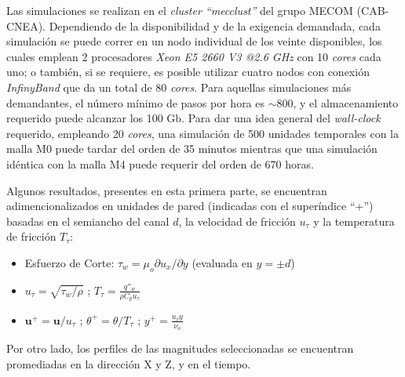 Las simulaciones se realizan en el \textit{cluster ``mecclust''} del grupo MECOM (CAB-CNEA). Dependiendo de la disponibilidad y de la exigencia demandada, cada simulación se puede correr en un nodo individual de los veinte disponibles, los cuales emplean 2 procesadores \textit{Xeon E5 2660 V3 @2.6 GHz} con 10 \textit{cores} cada uno; o también, si se requiere, es posible utilizar cuatro nodos con conexión \textit{InfinyBand} que da un total de 80 \textit{cores}. Para aquellas simulaciones más demandantes, el número mínimo de pasos por hora es $\sim 800$, y el almacenamiento requerido puede alcanzar los 100 Gb. Para dar una idea general del \textit{wall-clock} requerido, empleando 20 \textit{cores}, una simulación de 500 unidades temporales con la malla M0 puede tardar del orden de 35 minutos mientras que una simulación idéntica con la malla M4 puede requerir del orden de 670 horas.       


\begin{table}[H]
\centering
{}
\caption{Distintas resoluciones espaciales y temporales utilizadas en las simulaciones de validación. Debido a que la discretización en la dirección $Y$ es no uniforme , se reporta el máximo $\Delta y$ asociado.}
\label{tab:meshes}
\end{table}

Algunos resultados, presentes en esta primera parte, se encuentran adimencionalizados en unidades de pared (indicadas con el superíndice ``+'') basadas en el semiancho del canal $d$, la velocidad de fricción $u_{\tau}$ y la temperatura de fricción $T_{\tau}$:

\begin{itemize}
	\item Esfuerzo de Corte: $\tau_w= \mu_o \partial u_x / \partial y$ (evaluada en $y=\pm d$)  
	\item $u_{\tau} = \sqrt{\tau_w / \rho}$ ; $T_{\tau}=\frac{q''_w}{\rho C_p u_{\tau}}$
	\item $\mathbf{u}^+ = \mathbf{u} / u_{\tau}$ ; $\theta^+ = \theta / T_{\tau}$ ; $y^+ = \frac{u_{\tau} y}{\nu_o}$
\end{itemize}
Por otro lado, los perfiles de las magnitudes seleccionadas se encuentran promediadas en la dirección X y Z, y en el tiempo.

